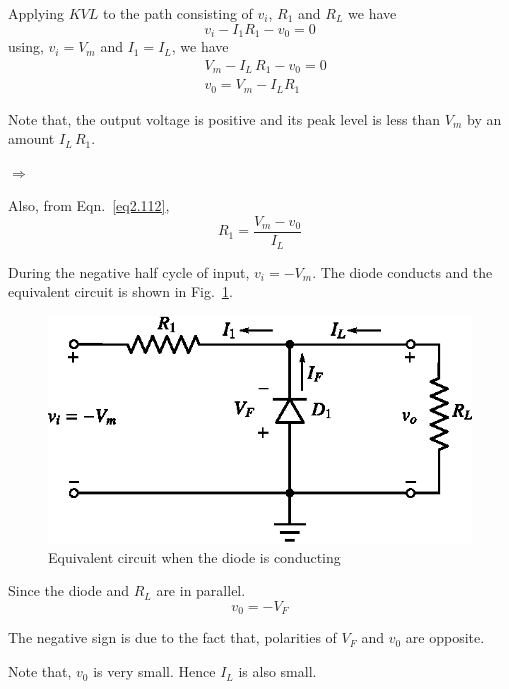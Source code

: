 Applying $KVL$ to the path consisting of $v_{i}$, $R_{1}$ and $R_{L}$ we have
\begin{equation}
v_{i}-I_{1}R_{1}-v_{0}=0\label{eq2.110}
\end{equation}
using, $v_{i}=V_{m}$ and $I_{1}=I_{L}$, we have
\begin{align}
& V_{m}-I_{L}\,R_{1}-v_{0}=0\label{eq2.111}\\
& v_{0}=V_{m}-I_{L}R_{1}\label{eq2.112}
\end{align}

Note that, the output voltage is positive and its peak level is less than $V_{m}$ by an amount $I_{L}\,R_{1}$.

$\Rightarrow$

Also, from Eqn.~\eqref{eq2.112},
\begin{equation}
R_{1}=\frac{V_{m}-v_{0}}{I_{L}}\label{eq2.113}
\end{equation}

During the negative half cycle of input, $v_{i}=-V_{m}$. The diode conducts and the equivalent circuit is shown in Fig.~\ref{fig2.33}.
\begin{figure}[H]
\centering
\includegraphics{chap2/fig2.33.eps}
\caption{Equivalent circuit when the diode is conducting}\label{fig2.33}
\end{figure}

Since the diode and $R_{L}$ are in parallel.
\begin{equation}
v_{0}=-V_{F}\label{eq2.114}
\end{equation}

The negative sign is due to the fact that, polarities of $V_{F}$ and $v_{0}$ are opposite.

Note that, $v_{0}$ is very small. Hence $I_{L}$ is also small.

